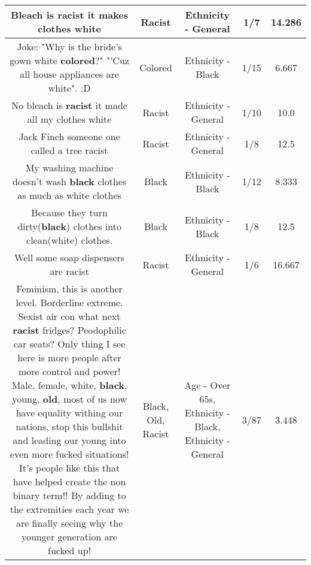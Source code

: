 \documentclass[11pt]{article}
\newlength\mylength
\begin{document}
\begin{center}
\begin{longtable}{|C{.65\mylength}|C{.30\mylength}|C{.12\mylength}|C{.12\mylength}|C{.12\mylength}|}
  \small Bleach is \textbf{racist} it makes clothes white\normalsize   & Racist & Ethnicity - General & 1/7 & 14.286 \\  \hline
  \small Joke: "Why is the bride's gown white \textbf{colored}?"  "'Cuz all house appliances are white".  :D\normalsize   & Colored & Ethnicity - Black & 1/15 & 6.667 \\  \hline
  \small No bleach is \textbf{racist} it made all my clothes white\normalsize   & Racist & Ethnicity - General & 1/10 & 10.0 \\  \hline
  \small Jack Finch someone one called a tree racist\normalsize   & Racist & Ethnicity - General & 1/8 & 12.5 \\  \hline
  \small My washing machine doesn't wash \textbf{black} clothes as much as white clothes\normalsize   & Black & Ethnicity - Black & 1/12 & 8.333 \\  \hline
  \small Because they turn dirty(\textbf{black}) clothes into clean(white) clothes.\normalsize   & Black & Ethnicity - Black & 1/8 & 12.5 \\  \hline
  \small Well some soap dispensers are racist\normalsize   & Racist & Ethnicity - General & 1/6 & 16.667 \\  \hline
  \small Feminism, this is another level. Borderline extreme. Sexist air con what next \textbf{racist} fridges? Peodophilic car seats? Only thing I see here is more people after more control and power! Male, female, white, \textbf{black}, young, \textbf{old}, most of us now have equality withing our nations, stop this bullshit and leading our young into even more fucked situations! It's people like this that have helped create the non binary term!! By adding to the extremities each year we are finally seeing why the younger generation are fucked up!\normalsize   & Black, Old, Racist & Age - Over 65s, Ethnicity - Black, Ethnicity - General & 3/87 & 3.448 \\  \hline

\end{longtable}
\end{center}
\end{document}
